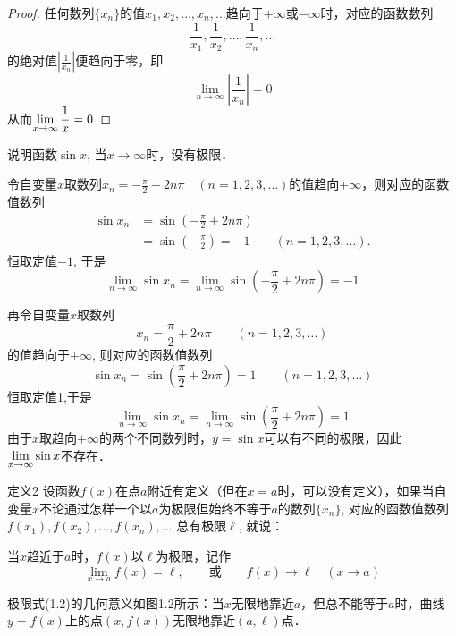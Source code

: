 \begin{proof}
任何数列$\{x_n\}$的值$x_1,x_2,\ldots,x_n,\ldots$趋向于$+\infty$或$-\infty$时，对应的函数数列
\[\frac{1}{x_1},\frac{1}{x_2},\ldots, \frac{1}{x_n},\ldots\]
的绝对值$\left|\frac{1}{x_n}\right|$便趋向于零，即
    \[\lim_{n\to\infty}\left|\frac{1}{x_n}\right|=0\]
    从而$\displaystyle\lim_{x\to\infty}\dfrac{1}{x}=0$
\end{proof}

\begin{example}
说明函数$\sin x$, 当$x\to\infty$时，没有极限．
\end{example}

\begin{solution}
令自变量$x$取数列$x_n=-\frac{\pi}{2}+2n\pi\quad (n=1,2,3,\ldots)$的值趋向$+\infty$，则对应的函数值数列
\[\begin{split}
    \sin x_n&=\sin\left(-\frac{\pi}{2}+2n\pi\right)\\
&=\sin\left(-\frac{\pi}{2}\right) =-1 \qquad (n=1, 2, 3, \ldots) .
\end{split}\]
恒取定值$-1$, 于是
\[\lim_{n\to\infty} \sin x_n=\lim_{n\to\infty} \sin \left(-\frac{\pi}{2}+2n\pi\right)=-1\]

再令自变量$x$取数列
\[x_n=\frac{\pi}{2}+2n\pi\qquad  (n=1, 2, 3, \ldots )\]
的值趋向于$+\infty$, 则对应的函数值数列
\[\sin x_n =\sin\left(\frac{\pi}{2}+2n\pi\right) =1\qquad  (n=1, 2, 3, \ldots)\]
恒取定值1,于是
\[\lim_{n\to\infty} \sin x_n=\lim_{n\to\infty} \sin\left(\frac{\pi}{2}+2n\pi\right) =1\]
由于$x$取趋向$+\infty$的两个不同数列时，$y=\sin x$可以有不同的极限，因此
$\displaystyle\lim_{x\to\infty} \sin x$不存在．
\end{solution}

\begin{blk}{定义2}
 设函数$f(x)$在点$a$附近有定义（但在$x=a$时，可以没有定义），如果当自变量$x$不论通过怎样一个以$a$为极限但始终不等于$a$的数列$\{x_n\}$, 对应的函数值数列$f (x_1) ,f (x_2) , \ldots,f(x_n ) ,\ldots$
总有极限$\ell$, 就说：

当$x$趋近于$a$时，$f(x)$以$\ell$为极限，记作
\begin{equation}
   \lim_{x\to a}f(x)=\ell,\qquad \text{或}\qquad f(x)\to \ell\quad (x\to a) 
\end{equation}
\end{blk}

极限式(1.2)的几何意义如图1.2所示：当$x$无限地靠近$a$，但总不能等于$a$时，曲线$y=f(x)$上的点$(x,f(x))$无限地靠近$(a,\ell)$点．

\begin{figure}[htp]
    \centering
{}
    \caption{}
\end{figure}

